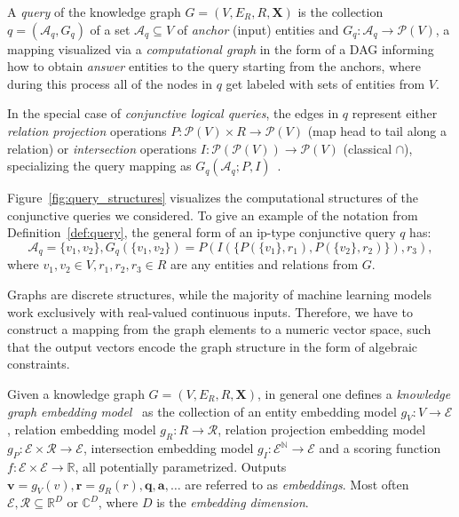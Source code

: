 \begin{definition}
    A \emph{query} of the knowledge graph $G=(V, E_R, R, \mathbf{X})$ is the collection $q=(\mathcal{A}_q, G_q)$ of a set $\mathcal{A}_q \subseteq V$ of \emph{anchor} (input) entities and $G_q: \mathcal{A}_q \to \mathcal{P}(V)$, a mapping visualized via a \emph{computational graph} in the form of a DAG informing how to obtain \emph{answer} entities to the query starting from the anchors, where during this process all of the nodes in $q$ get labeled with sets of entities from $V$. 
    
    In the special case of \emph{conjunctive logical queries}, the edges in $q$ represent either \emph{relation projection} operations $P: \mathcal{P}(V) \times R \to \mathcal{P}(V)$ (map head to tail along a relation) or \emph{intersection} operations $I: \mathcal{P}(\mathcal{P}(V)) \to \mathcal{P}(V)$ (classical $\cap$), specializing the query mapping as $G_q(\mathcal{A}_q;P,I)$~\cite{ren_query2box_2020}.
    \label{def:query}
\end{definition}
Figure~\ref{fig:query_structures} visualizes the computational structures of the conjunctive queries we considered. To give an example of the notation from Definition~\ref{def:query}, the general form of an ip-type conjunctive query $q$ has: $$\mathcal{A}_q=\{v_1,v_2\}, G_q(\{v_1,v_2\})=P(I(\{P(\{v_1\},r_1),P(\{v_2\},r_2)\}),r_3),$$
where $v_1,v_2 \in V, r_1,r_2,r_3 \in R$ are any entities and relations from $G$.

Graphs are discrete structures, while the majority of machine learning models work exclusively with real-valued continuous inputs. Therefore, we have to construct a mapping from the graph elements to a numeric vector space, such that the output vectors encode the graph structure in the form of algebraic constraints.
\begin{definition}
Given a knowledge graph $G = (V, E_R, R, \mathbf{X})$, in general one defines a \textit{knowledge graph embedding model}~\cite{ji_survey_2022,liang_survey_2024,ren_query2box_2020} as the collection of an entity embedding model $g_V: V \to \mathcal{E}$, relation embedding model $g_R: R \to \mathcal{R}$, relation projection embedding model $g_P: \mathcal{E} \times \mathcal{R} \to \mathcal{E}$, intersection embedding model $g_I: \mathcal{\mathcal{E}}^{\mathbb{N}} \to \mathcal{E}$ and a scoring function $f: \mathcal{E} \times \mathcal{E} \to \mathbb{R}$, all potentially parametrized. Outputs $\mathbf{v} = g_V(v), \mathbf{r} = g_R(r), \mathbf{q}, \mathbf{a}, \dots$ are referred to as \emph{embeddings}. Most often $\mathcal{E}, \mathcal{R} \subseteq \mathbb{R}^D$ or $\mathbb{C}^D$, where $D$ is the \emph{embedding dimension}. 
\end{definition}

